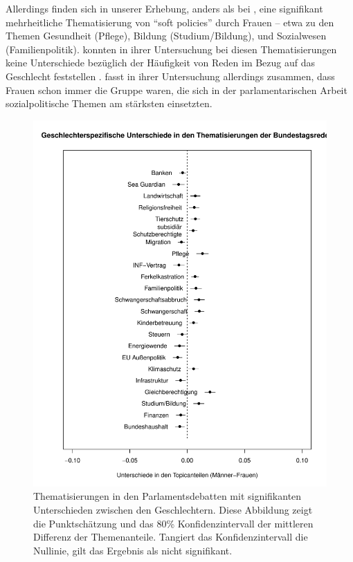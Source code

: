 \documentclass[12pt, 
    twoside=false, 
    bibliography=totoc, 
    numbers=endperiod, 
    headings=normal, 
    toc=chapterentrydotfill
    ]{scrbook}
\begin{document}
Allerdings finden sich in unserer Erhebung, anders als bei \textcite{back_2014}, eine signifikant mehrheitliche Thematisierung von \enquote{soft policies} \parencite[510]{back_2014} durch Frauen -- etwa zu den Themen Gesundheit (Pflege), Bildung (Studium/Bildung), und Sozialwesen (Familienpolitik). \textcite{back_2014} konnten in ihrer Untersuchung bei diesen Thematisierungen keine Unterschiede bezüglich der Häufigkeit von Reden im Bezug auf das Geschlecht feststellen \parencite[512]{back_2014}. \textcite{wangnerud_2000} fasst in ihrer Untersuchung allerdings zusammen, dass Frauen schon immer die Gruppe waren, die sich in der parlamentarischen Arbeit sozialpolitische Themen am stärksten einsetzten.

\begin{figure}[H]
    \centering
    \includegraphics[scale=0.6]{images/stm_differences_top.pdf}
    \caption[Thematisierungen in den Parlamentsdebatten mit signifikanten Unterschieden zwischen den Geschlechtern]{Thematisierungen in den Parlamentsdebatten mit signifikanten Unterschieden zwischen den Geschlechtern. Diese Abbildung zeigt die Punktschätzung und das 80\% Konfidenzintervall der mittleren Differenz der Themenanteile. Tangiert das Konfidenzintervall die Nullinie, gilt das Ergebnis als nicht signifikant.}
    \label{fig:differences_stm_top}
\end{figure}
\end{document}
